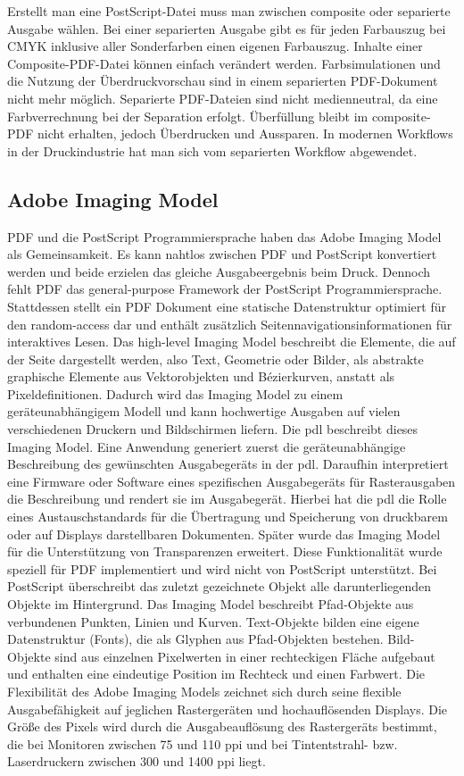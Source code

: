 Erstellt man eine PostScript-Datei muss man zwischen composite oder separierte Ausgabe wählen. Bei einer separierten Ausgabe gibt es für jeden Farbauszug bei CMYK inklusive aller Sonderfarben einen eigenen Farbauszug. Inhalte einer Composite-PDF-Datei können einfach verändert werden. Farbsimulationen und die Nutzung der Überdruckvorschau sind in einem separierten PDF-Dokument nicht mehr möglich. Separierte PDF-Dateien sind nicht medienneutral, da eine Farbverrechnung bei der Separation erfolgt. Überfüllung bleibt im composite-PDF nicht erhalten, jedoch Überdrucken und Aussparen. In modernen Workflows in der Druckindustrie hat man sich vom separierten Workflow abgewendet.
\cite{schneeberger}

\subsection{Adobe Imaging Model}
PDF und die PostScript Programmiersprache haben das Adobe Imaging Model als Gemeinsamkeit. Es kann nahtlos zwischen PDF und PostScript konvertiert werden und beide erzielen das gleiche Ausgabeergebnis beim Druck. Dennoch fehlt PDF das general-purpose Framework der PostScript Programmiersprache. Stattdessen stellt ein PDF Dokument eine statische Datenstruktur optimiert für den random-access dar und enthält zusätzlich Seitennavigationsinformationen für interaktives Lesen. Das high-level Imaging Model beschreibt die Elemente, die auf der Seite dargestellt werden, also Text, Geometrie oder Bilder, als abstrakte graphische Elemente aus Vektorobjekten und Bézierkurven, anstatt als Pixeldefinitionen. Dadurch wird das Imaging Model zu einem geräteunabhängigem Modell und kann hochwertige Ausgaben auf vielen verschiedenen Druckern und Bildschirmen liefern. Die \gls{pdl} beschreibt dieses Imaging Model. Eine Anwendung generiert zuerst die geräteunabhängige Beschreibung des gewünschten Ausgabegeräts in der \gls{pdl}. Daraufhin interpretiert eine Firmware oder Software eines spezifischen Ausgabegeräts für Rasterausgaben die Beschreibung und rendert sie im Ausgabegerät. Hierbei hat die \gls{pdl} die Rolle eines Austauschstandards für die Übertragung und Speicherung von druckbarem oder auf Displays darstellbaren Dokumenten. \cite{adobe-postscript} Später wurde das Imaging Model für die Unterstützung von Transparenzen erweitert. Diese Funktionalität wurde speziell für PDF implementiert und wird nicht von PostScript unterstützt. Bei PostScript überschreibt das zuletzt gezeichnete Objekt alle darunterliegenden Objekte im Hintergrund. 
Das Imaging Model beschreibt Pfad-Objekte aus verbundenen Punkten, Linien und Kurven. Text-Objekte bilden eine eigene Datenstruktur (Fonts), die als Glyphen aus Pfad-Objekten bestehen. Bild-Objekte sind aus einzelnen Pixelwerten in einer rechteckigen Fläche aufgebaut und enthalten eine eindeutige Position im Rechteck und einen Farbwert. Die Flexibilität des Adobe Imaging Models zeichnet sich durch seine flexible Ausgabefähigkeit auf jeglichen Rastergeräten und hochauflösenden Displays. Die Größe des Pixels wird durch die Ausgabeauflösung des Rastergeräts bestimmt, die bei Monitoren zwischen 75 und 110 \gls{ppi} und bei Tintentstrahl- bzw. Laserdruckern zwischen 300 und 1400 \gls{ppi} liegt.
\cite{schneeberger}

